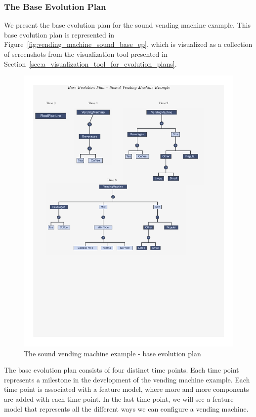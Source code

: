 \documentclass[a4paper,english]{ifimaster}
\begin{document}
\subsubsection{The Base Evolution Plan}%

We present the base evolution plan for the sound vending machine example. This base evolution plan is represented in Figure~\vref{fig:vending_machine_sound_base_ep}, which is visualized as a collection of screenshots from the visualization tool presented in Section~\vref{sec:a_visualization_tool_for_evolution_plans}.

\begin{figure}[htpb]
  \centering
  \includegraphics[width=\linewidth]{vending_machine/base_plan.pdf}
  \caption{The sound vending machine example - base evolution plan}%
  \label{fig:vending_machine_sound_base_ep}
\end{figure}

The base evolution plan consists of four distinct time points. Each time point represents a milestone in the development of the vending machine example. Each time point is associated with a feature model, where more and more components are added with each time point. In the last time point, we will see a feature model that represents all the different ways we can configure a vending machine.
\end{document}
